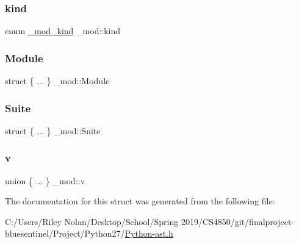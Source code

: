 \subsubsection{\texorpdfstring{kind}{kind}}
{\footnotesize\ttfamily enum \mbox{\hyperlink{_python-ast_8h_a8f50e8590be64db9ce87b40df20e1a30}{\+\_\+mod\+\_\+kind}} \+\_\+mod\+::kind}

\mbox{\label{struct__mod_aeb7d7e99f444dd61a4ebf79eb4c3caa0}} 
\subsubsection{\texorpdfstring{Module}{Module}}
{\footnotesize\ttfamily struct \{ ... \}   \+\_\+mod\+::\+Module}

\mbox{\label{struct__mod_a07f136d6ca663aaca74a6924cab6b4d3}} 
\subsubsection{\texorpdfstring{Suite}{Suite}}
{\footnotesize\ttfamily struct \{ ... \}   \+\_\+mod\+::\+Suite}

\mbox{\label{struct__mod_a58c87fa5dffa02684cff14f446e37f57}} 
\subsubsection{\texorpdfstring{v}{v}}
{\footnotesize\ttfamily union \{ ... \}   \+\_\+mod\+::v}



The documentation for this struct was generated from the following file\+:\begin{DoxyCompactItemize}
\item 
C\+:/\+Users/\+Riley Nolan/\+Desktop/\+School/\+Spring 2019/\+C\+S4850/git/finalproject-\/bluesentinel/\+Project/\+Python27/\mbox{\hyperlink{_python-ast_8h}{Python-\/ast.\+h}}\end{DoxyCompactItemize}
